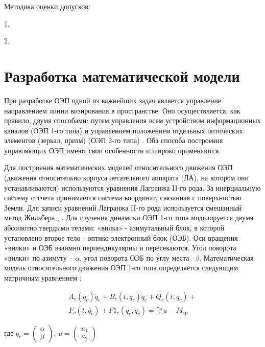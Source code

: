 Методика оценки допусков:

1.

2.


\section{Разработка математической модели} \label{sec:ch2/sec3}

При разработке ОЭП одной из важнейших задач является управление направлением линии визирования в пространстве. Оно осуществляется, как правило, двумя способами: путем управления всем устройством информационных каналов (ОЭП 1-го типа) и управлением положением отдельных оптических элементов (зеркал, призм) (ОЭП 2-го типа) \cite[]{Karpov23}. Оба способа построения управляющих ОЭП имеют свои особенности и широко применяются.

Для построения математических моделей относительного движения ОЭП (движения относительно корпуса летательного аппарата (ЛА), на котором они устанавливаются) используются уравнения Лагранжа II-го рода. За инерциальную систему отсчета принимается система координат, связанная с поверхностью Земли. Для записи уравнений Лагранжа II-го рода используется смешанный метод Жильбера \cite[]{Belyakov}, \cite[]{Baloev16}. Для изучения динамики ОЭП 1-го типа моделируется двумя абсолютно твердыми телами: «вилка» - азимутальный блок, в которой установлено второе тело - оптико-электронный блок (ОЭБ). Оси вращения «вилки» и ОЭБ взаимно перпендикулярны и пересекаются. Угол поворота «вилки» по азимуту – $\alpha$, угол поворота ОЭБ по углу места –$\beta$. Математическая модель относительного движения ОЭП 1-го типа определяется следующим матричным уравнением \cite[]{Karpov23}:

\begin{equation}
\label{eq:p2:6-}
\begin{alignedat}{2}
A_c\left(q_c\right){\ddot{q}}_c+B_c\left(t,q_c\right){\dot{q}}_c+Q_c\left(t,q_c\right)+\\
F_c\left(t,q_c\right)+F1_c\left(q_c,{\dot{q}}_c\right)=\frac{c_M}{r}u-M_{\textit{тр}}
\end{alignedat}
\end{equation}

где
$q_c=\left(\begin{array}{cc}
\alpha{} \\
\beta{}
\end{array}\right)$, 
$u=\left(\begin{array}{
	cc}
u_1 \\
u_2
\end{array}\right)$

